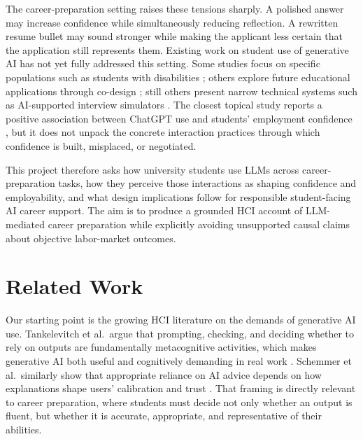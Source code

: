 \documentclass[sigconf]{acmart}
\begin{document}
The career-preparation setting raises these tensions sharply. A polished answer may increase confidence while simultaneously reducing reflection. A rewritten resume bullet may sound stronger while making the applicant less certain that the application still represents them. Existing work on student use of generative AI has not yet fully addressed this setting. Some studies focus on specific populations such as students with disabilities \cite{atcheson2025disabilitygenai}; others explore future educational applications through co-design \cite{prasad2025multimodal}; still others present narrow technical systems such as AI-supported interview simulators \cite{lee2024vrinterview}. The closest topical study reports a positive association between ChatGPT use and students' employment confidence \cite{xiao2025employmentconfidence}, but it does not unpack the concrete interaction practices through which confidence is built, misplaced, or negotiated.

This project therefore asks how university students use LLMs across career-preparation tasks, how they perceive those interactions as shaping confidence and employability, and what design implications follow for responsible student-facing AI career support. The aim is to produce a grounded HCI account of LLM-mediated career preparation while explicitly avoiding unsupported causal claims about objective labor-market outcomes.

\section{Related Work}
Our starting point is the growing HCI literature on the demands of generative AI use. Tankelevitch et al.\ argue that prompting, checking, and deciding whether to rely on outputs are fundamentally metacognitive activities, which makes generative AI both useful and cognitively demanding in real work \cite{tankelevitch2024metacognitive}. Schemmer et al.\ similarly show that appropriate reliance on AI advice depends on how explanations shape users' calibration and trust \cite{schemmer2023appropriatereliance}. That framing is directly relevant to career preparation, where students must decide not only whether an output is fluent, but whether it is accurate, appropriate, and representative of their abilities.
\end{document}

